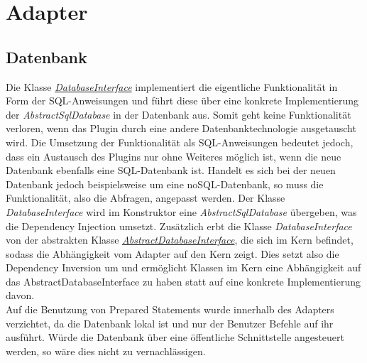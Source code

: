 \section{Adapter}
\subsection{Datenbank}
Die Klasse \href{https://github.com/moorts/Morik/blob/main/src/adapters/database/DatabaseInterface.h}{\textit{DatabaseInterface}} implementiert die eigentliche Funktionalität in Form der SQL-Anweisungen und führt diese über eine konkrete Implementierung der \textit{AbstractSqlDatabase} in der Datenbank aus. Somit geht keine Funktionalität verloren, wenn das Plugin durch eine andere Datenbanktechnologie ausgetauscht wird. Die Umsetzung der Funktionalität als SQL-Anweisungen bedeutet jedoch, dass ein Austausch des Plugins nur ohne Weiteres möglich ist, wenn die neue Datenbank ebenfalls eine SQL-Datenbank ist. Handelt es sich bei der neuen Datenbank jedoch beispielsweise um eine noSQL-Datenbank, so muss die Funktionalität, also die Abfragen, angepasst werden. Der Klasse \textit{DatabaseInterface} wird im Konstruktor eine \textit{AbstractSqlDatabase} übergeben, was die Dependency Injection umsetzt. Zusätzlich erbt die Klasse \textit{DatabaseInterface} von der abstrakten Klasse \href{https://github.com/moorts/Morik/blob/main/src/application/AbstractDatabaseInterface.h}{\textit{AbstractDatabaseInterface}}, die sich im Kern befindet, sodass die Abhängigkeit vom Adapter auf den Kern zeigt. Dies setzt also die Dependency Inversion um und ermöglicht Klassen im Kern eine Abhängigkeit auf das AbstractDatabaseInterface zu haben statt auf eine konkrete Implementierung davon.\\
Auf die Benutzung von Prepared Statements wurde innerhalb des Adapters verzichtet, da die Datenbank lokal ist und nur der Benutzer Befehle auf ihr ausführt. Würde die Datenbank über eine öffentliche Schnittstelle angesteuert werden, so wäre dies nicht zu vernachlässigen.
